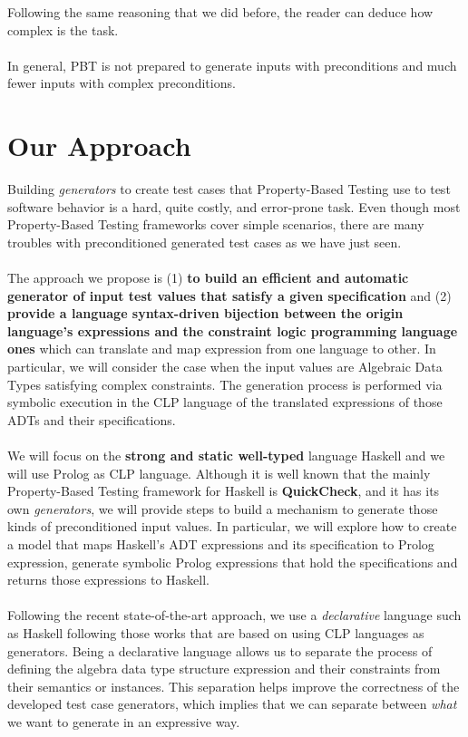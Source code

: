 \documentclass{report}
\theoremstyle{definition}
\theoremstyle{definition}
\begin{document}
Following the same reasoning that we did before, the reader can deduce how complex is the task.\\\\
In general, PBT is not prepared to generate inputs with preconditions and much fewer inputs with  complex preconditions.

\section{Our Approach}

Building \textit{generators} to create test cases that Property-Based Testing use to test software behavior is a hard, quite costly, and error-prone task. Even though most Property-Based Testing frameworks cover simple scenarios, there are many troubles with preconditioned generated test cases as we have just seen.\\\\
The approach we propose is (1) \textbf{to build an efficient and automatic generator of input test values that satisfy a given specification} and (2) \textbf{provide a language syntax-driven bijection between the origin language's expressions and the constraint logic programming language ones} which can translate and map expression from one language to other. In particular, we will consider the case when the input values are Algebraic Data Types satisfying complex constraints. The generation process is performed via symbolic execution in the CLP language of the translated expressions of those ADTs and their specifications.\\\\
We will focus on the \textbf{strong and static well-typed} language Haskell and we will use Prolog as CLP language. Although it is well known that the mainly Property-Based Testing framework for Haskell is \textbf{QuickCheck}, and it has its own \textit{generators}, we will provide steps to build a mechanism to generate those kinds of preconditioned input values. In particular, we will explore how to create a model that maps Haskell's ADT expressions and its specification to Prolog expression, generate symbolic Prolog expressions that hold the specifications and returns those expressions to Haskell. \\\\
Following the recent state-of-the-art approach, we use a \textit{declarative} language such as Haskell following those works that are based on using CLP languages as generators. Being a declarative language allows us to separate the process of defining the algebra data type structure expression and their constraints from their semantics or instances. This separation helps improve the correctness of the developed test case generators, which implies that we can separate between \textit{what} we want to generate in an expressive way.\\\\
\end{document}
